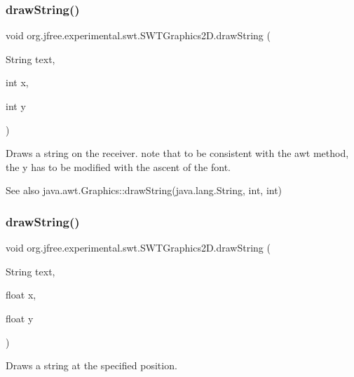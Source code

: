 \subsubsection{\texorpdfstring{draw\+String()}{drawString()}\hspace{0.1cm}{\footnotesize\ttfamily [1/4]}}
{\footnotesize\ttfamily void org.\+jfree.\+experimental.\+swt.\+S\+W\+T\+Graphics2\+D.\+draw\+String (\begin{DoxyParamCaption}\item[{String}]{text,  }\item[{int}]{x,  }\item[{int}]{y }\end{DoxyParamCaption})}

Draws a string on the receiver. note that to be consistent with the awt method, the y has to be modified with the ascent of the font.

\begin{DoxySeeAlso}{See also}
java.\+awt.\+Graphics\+::draw\+String(java.\+lang.\+String, int, int) 
\end{DoxySeeAlso}
\mbox{\label{classorg_1_1jfree_1_1experimental_1_1swt_1_1_s_w_t_graphics2_d_a91285179103cfc09b32f29faefddafad}} 
\subsubsection{\texorpdfstring{draw\+String()}{drawString()}\hspace{0.1cm}{\footnotesize\ttfamily [2/4]}}
{\footnotesize\ttfamily void org.\+jfree.\+experimental.\+swt.\+S\+W\+T\+Graphics2\+D.\+draw\+String (\begin{DoxyParamCaption}\item[{String}]{text,  }\item[{float}]{x,  }\item[{float}]{y }\end{DoxyParamCaption})}

Draws a string at the specified position.



